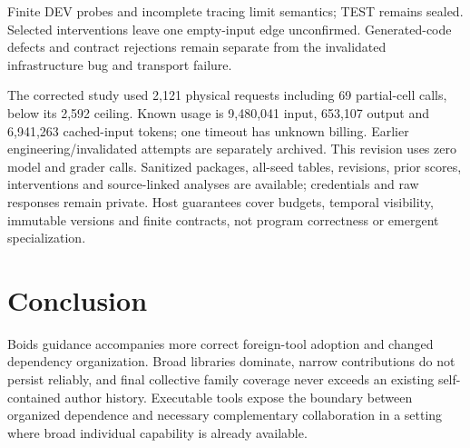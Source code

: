 \documentclass[sigconf,anonymous]{aamas}
\begin{document}
Finite DEV probes and incomplete tracing limit semantics; TEST remains sealed. Selected interventions leave one empty-input edge unconfirmed. Generated-code defects and contract rejections remain separate from the invalidated infrastructure bug and transport failure.

The corrected study used 2,121 physical requests including 69 partial-cell calls, below its 2,592 ceiling. Known usage is 9,480,041 input, 653,107 output and 6,941,263 cached-input tokens; one timeout has unknown billing. Earlier engineering/invalidated attempts are separately archived. This revision uses zero model and grader calls. Sanitized packages, all-seed tables, revisions, prior scores, interventions and source-linked analyses are available; credentials and raw responses remain private. Host guarantees cover budgets, temporal visibility, immutable versions and finite contracts, not program correctness or emergent specialization.

\section{Conclusion}
Boids guidance accompanies more correct foreign-tool adoption and changed dependency organization. Broad libraries dominate, narrow contributions do not persist reliably, and final collective family coverage never exceeds an existing self-contained author history. Executable tools expose the boundary between organized dependence and necessary complementary collaboration in a setting where broad individual capability is already available.

\clearpage

\end{document}
